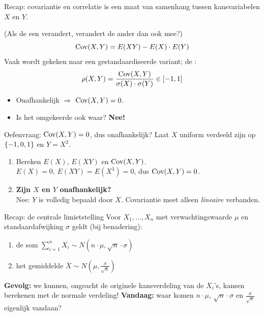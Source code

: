     \begin{frame}{Recap: covariantie en correlatie}
         is een maat van samenhang tussen kansvariabelen $X$ en $Y$.\medskip

        (Als de een verandert, verandert de ander dan ook mee?)
        \[
            \text{Cov}(X, Y) = E(XY) - E(X) \cdot E(Y)
        \]
        Vaak wordt gekeken naar een gestandaardiseerde variant; de :
        \[
            \rho(X, Y) = \frac{\text{Cov}(X, Y)}{\sigma(X) \cdot \sigma(Y)} \in [-1, 1]
        \]
        \vfill
        \begin{itemize}
            \item Onafhankelijk $\Rightarrow$ $\text{Cov}(X, Y) = 0$.
            \item Is het omgekeerde ook waar? \pause \textbf{Nee!}
        \end{itemize}
    \end{frame}

    \begin{frame}{Oefenvraag: $\text{Cov}(X, Y) = 0$, dus onafhankelijk?}
        Laat $X$ uniform verdeeld zijn op $\left\{-1, 0, 1\right\}$ en $Y = X^2$.
        \vfill
        \begin{enumerate}[<+->]\setlength\itemsep{3em}
            \item Bereken $E(X)$, $E(XY)$ en $\text{Cov}(X, Y)$.\\
            $E(X) = 0$, $E(XY) = E(X^3) = 0$, dus $\text{Cov}(X, Y) = 0$.
            \item \textbf{Zijn $X$ en $Y$ onafhankelijk?}\\\pause
            Nee: $Y$ is volledig bepaald door $X$. Covariantie meet alleen \emph{lineaire} verbanden.
        \end{enumerate}
    \end{frame}

    \begin{frame}{Recap: de centrale limietstelling}
        Voor  $X_1, \ldots, X_n$ met verwachtingswaarde $\mu$ en standaardafwijking $\sigma$ geldt (bij benadering):
        \begin{enumerate}[<+->]\setlength\itemsep{3em}
            \item de som $\sum_{i=1}^n X_i \sim N\left(n \cdot \mu, \sqrt{n} \cdot \sigma\right)$ 
            \item het gemiddelde $\overline{X} \sim N\left(\mu, \frac{\sigma}{\sqrt{n}}\right)$
        \end{enumerate}
        \vfill\pause
        \textbf{Gevolg:} we kunnen, ongeacht de originele kansverdeling van de $X_i$'s, kansen berekenen met de normale verdeling!
        \vfill\pause
        \textbf{Vandaag:} waar komen $n \cdot \mu$, $\sqrt{n} \cdot \sigma$ en $\frac{\sigma}{\sqrt{n}}$ eigenlijk vandaan?
    \end{frame}

